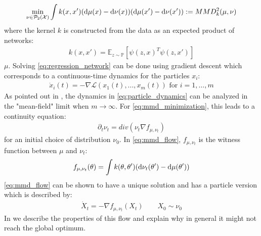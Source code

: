 \begin{align}\label{eq:mmd_minimization}
	\min_{\nu \in \mathcal{P}_2({{\mathcal X}})} \int k(x,x') (\mathop{}\!\mathrm{d}\mu(x) -\mathop{}\!\mathrm{d}\nu(x))(\mathop{}\!\mathrm{d}\mu(x') -\mathop{}\!\mathrm{d}\nu(x'))  := MMD_k^2(\mu,\nu)
\end{align} 
where the kernel $k$ is constructed from the data as an expected product of networks:
\begin{align}
	k(x,x') = \mathbb{E}_{z\sim \mathbb{P}} [\psi(z,x)^T\psi(z,x')]
\end{align}
 $\mu$. Solving \cref{eq:regression_network} can be done using gradient descent which corresponds to a continuous-time dynamics for the particles $x_i$:
\begin{align}\label{eq:particle_dynamics}
	\dot{x}_i(t)= -\nabla \mathcal{L}(x_1(t),...,x_m(t)) \text{ for } i=1, \dots, m
\end{align}  
 As pointed out in \cite{chizat2018global,Rotskoff:2019}, the dynamics in \cref{eq:particle_dynamics} can be analyzed in the "mean-field" limit when $m\rightarrow \infty$. For \cref{eq:mmd_minimization}, this leads to a continuity equation:
\begin{align}\label{eq:mmd_flow}
	\partial_t \nu_t = div(\nu_t \nabla f_{\mu,\nu_t})
\end{align}
for an initial choice of distribution $\nu_0$. In \cref{eq:mmd_flow}, $f_{\mu,\nu_t}$ is the witness function between $\mu$ and $\nu_t$:%
\[
f_{\mu,\nu_t}(\theta) =  \int k(\theta,\theta')(\mathop{}\!\mathrm{d} \nu_t(\theta')-\mathop{}\!\mathrm{d}\mu(\theta') ) 
\]
\cref{eq:mmd_flow} can be shown to have a unique solution and has a particle version which is described by:
\begin{align}\label{eq:particle_equation}
	\dot{X}_t = -\nabla f_{\mu,\nu_t}(X_t) \qquad X_0\sim \nu_0
\end{align}
In  we describe the properties of this flow and explain why in general it might not reach the global optimum.


%

